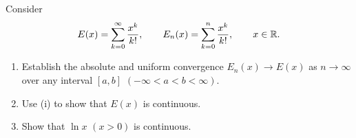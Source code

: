 \begingroup
\renewcommand{\labelenumi}{(\roman{enumi})}
\begin{exercise}
  \label{ex:hw06:exponential-continuity}
  Consider
  \[
    E(x)=\sum_{k=0}^{\infty}\frac{x^k}{k!},\qquad
    E_n(x)=\sum_{k=0}^{n}\frac{x^k}{k!},\qquad x\in\mathbb{R}.
  \]
  \begin{enumerate}
    \item Establish the absolute and uniform convergence $E_n(x)\to E(x)$
      as $n\to\infty$ over any interval $[a,b]$ $(-\infty<a<b<\infty)$.
    \item Use (i) to show that $E(x)$ is continuous.
    \item Show that $\ln x$ $(x>0)$ is continuous.
  \end{enumerate}
\end{exercise}
\endgroup
